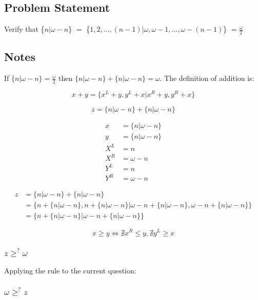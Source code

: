 \subsection*{Problem Statement}
\def \surr[#1][#2]{\{#1$|$#2\}}

Verify that \surr[$n$][$\omega - n$]
$=$
\surr[$1,2,...,(n - 1)$][$\omega, \omega - 1, ..., \omega - (n - 1)$]
$= \frac{\omega}{2}$

\subsection*{Notes}
If $\{n|\omega - n\}=\frac{\omega}{2}$ then $\{n|\omega - n\} + \{n|\omega - n\}=\omega$.  The definition of addition is:

\begin{equation*}
    x + y = \{x^L + y, y^L + x | x^R + y, y^R + x\}
\end{equation*}

\begin{equation*}
    z = \{n|\omega - n\} + \{n|\omega - n\}
\end{equation*}

\begin{align*}
    x &= \{n|\omega - n\} \\
    y &= \{n|\omega - n\} \\
    X^L &= n \\
    X^R &= \omega - n \\
    Y^L &= n \\
    Y^R &= \omega - n
\end{align*}

\begin{align*}
    z &= \{n|\omega - n\} + \{n|\omega - n\} \\
    &= \{n + \{n|\omega - n\}, n + \{n|\omega - n\} | \omega - n + \{n|\omega - n\}, \omega - n + \{n|\omega - n\}\} \\
    &= \{n + \{n|\omega - n\} | \omega - n + \{n|\omega - n\}\}
\end{align*}

\begin{equation*}
    x \geqslant y \Leftrightarrow \nexists x^R \leq y, \nexists y^L \geq x
\end{equation*}

\subsubsection*{$z \ge^? \omega$}

\surrealgeqexplain

\noindent Applying the rule to the current question:

\noindent {}


\subsubsection*{$\omega \ge^? z$}